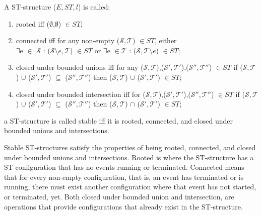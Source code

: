     \begin{definition}
        \label{def:stable st-structures}
        A ST-structure ($E, ST,l$) is called:
        
        \begin{enumerate}
            \item rooted iff ($\emptyset$,$\emptyset$) $\in ST$;
            \item connected iff for any non-empty ($\mathcal{S},\mathcal{T}$) $\in ST$, either \\
            $\exists$e $\in$ $\mathcal{S}$ : ($\mathcal{S}\setminus e, \mathcal{T}$) $\in ST$ or $\exists$e $\in \mathcal{T}$ : ($\mathcal{S}, \mathcal{T}\setminus e$) $\in ST$;
            \item closed under bounded unions iff for any ($\mathcal{S},\mathcal{T}$),($\mathcal{S}',\mathcal{T}'$),($\mathcal{S}'',\mathcal{T}''$) $\in ST$ if ($\mathcal{S},\mathcal{T}$) $\cup$ ($\mathcal{S}',\mathcal{T}'$) $\subseteq$ ($\mathcal{S}'',\mathcal{T}''$) then ($\mathcal{S},\mathcal{T}$) $\cup$ ($\mathcal{S}',\mathcal{T}'$) $\in ST$;
            \item closed under bounded intersection iff for ($\mathcal{S},\mathcal{T}$),($\mathcal{S}',\mathcal{T}'$),($\mathcal{S}'',\mathcal{T}''$) $\in ST$ if ($\mathcal{S},\mathcal{T}$) $\cup$ ($\mathcal{S}',\mathcal{T}'$) $\subseteq$ ($\mathcal{S}'',\mathcal{T}''$) then ($\mathcal{S},\mathcal{T}$) $\cap$ ($\mathcal{S}',\mathcal{T}'$) $\in ST$;
        \end{enumerate}
        
        a ST-structure is called stable iff it is rooted, connected, and closed under bounded unions and intersections.
    \end{definition}
    
    Stable ST-structures satisfy the properties of being rooted, connected, and closed under bounded unions and intersections. Rooted is where the ST-structure has a ST-configuration that has no events running or terminated. Connected means that for every non-empty configuration, that is, an event has terminated or is running, there must exist another configuration where that event has not started, or terminated, yet. Both closed under bounded union and intersection, are operations that provide configurations that already exist in the ST-structure.
    

